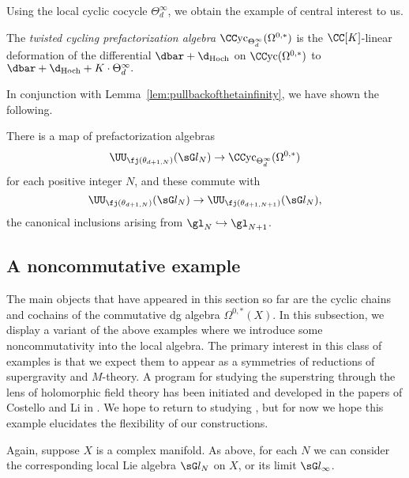Using the local cyclic cocycle $\Theta^\infty_d$, we obtain the example of central interest to us.

\begin{dfn}
The {\em twisted cycling prefactorization algebra} $\CCyc_{\Theta_d^\infty}(\Omega^{0,*})$ 
is the $\CC[K]$-linear deformation of the differential $\dbar + \d_{\rm Hoch}$ on $\CCyc(\Omega^{0,*})$ to
$\dbar + \d_{\rm Hoch} + K \cdot \Theta^\infty_d.$ 
\end{dfn}

In conjunction with Lemma~\ref{lem:pullbackofthetainfinity}, 
we have shown the following.

\begin{prop}
There is a map of prefactorization algebras
\[
\UU_{\fj(\theta_{d+1,N})} (\sG l_N) \to \CCyc_{\Theta_d^\infty}(\Omega^{0,*})
\]
for each positive integer $N$, and these commute with  
\[
\UU_{\fj(\theta_{d+1,N})} (\sG l_N) \to \UU_{\fj(\theta_{d+1,N+1})} (\sG l_N),
\]
the canonical inclusions arising from $\gl_N \hookrightarrow \gl_{N+1}$.
\end{prop}


\subsection{A noncommutative example}


The main objects that have appeared in this section so far are the cyclic chains and cochains of the commutative dg algebra $\Omega^{0,*}(X)$. 
In this subsection, we display a variant of the above examples where we introduce some noncommutativity into the local algebra. 
The primary interest in this class of examples is that we expect them to appear as a symmetries of reductions of supergravity and $M$-theory. 
A program for studying the superstring through the lens of holomorphic field theory has been initiated and developed in the papers of Costello and Li in  \cite{...}.
We hope to return to studying , but for now we hope this example elucidates the flexibility of our constructions. 

Again, suppose $X$ is a complex manifold. 
As above, for each $N$ we can consider the corresponding local Lie algebra $\sG l_N$ on $X$, or its limit $\sG l_\infty$. 

